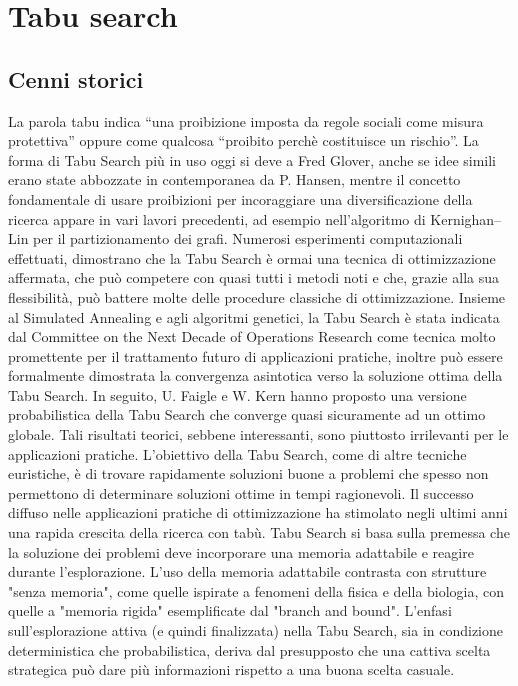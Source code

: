 \chapter{Tabu search}
\section{Cenni storici}
La parola tabu indica “una proibizione imposta da regole sociali come misura protettiva” oppure come qualcosa “proibito perchè costituisce un rischio”.
La forma di Tabu Search più in uso oggi si deve a Fred Glover, anche se idee simili erano state abbozzate in contemporanea da P. Hansen, mentre il concetto fondamentale di usare
proibizioni per incoraggiare una diversificazione della ricerca appare in vari lavori precedenti, ad esempio nell'algoritmo di Kernighan–Lin per il partizionamento dei grafi.
Numerosi esperimenti computazionali effettuati, dimostrano che la Tabu Search è ormai una
tecnica di ottimizzazione affermata, che può competere con quasi tutti i metodi noti e che,
grazie alla sua flessibilità, può battere molte delle procedure classiche di ottimizzazione.
Insieme al Simulated Annealing e agli algoritmi genetici, la Tabu Search è stata indicata dal Committee on the Next Decade of Operations Research come tecnica molto promettente per il trattamento futuro di applicazioni pratiche, inoltre può essere formalmente
dimostrata la convergenza asintotica verso la soluzione ottima della Tabu Search.
In seguito, U. Faigle e W. Kern hanno proposto una versione probabilistica della Tabu
Search che converge quasi sicuramente ad un ottimo globale. Tali risultati teorici, sebbene
interessanti, sono piuttosto irrilevanti per le applicazioni pratiche. L'obiettivo della Tabu Search, come di altre tecniche euristiche, è di trovare rapidamente soluzioni buone a
problemi che spesso non permettono di determinare soluzioni ottime in tempi ragionevoli.
Il successo diffuso nelle applicazioni pratiche di ottimizzazione ha stimolato negli ultimi anni una rapida crescita della ricerca con tabù.
Tabu Search si basa sulla premessa che la soluzione dei problemi deve incorporare una memoria adattabile e reagire durante l'esplorazione. L'uso della memoria adattabile contrasta con strutture "senza memoria", come quelle ispirate a fenomeni della fisica e della biologia, con quelle a "memoria rigida" esemplificate dal "branch and bound". 
L'enfasi sull'esplorazione attiva (e quindi finalizzata) nella Tabu Search, sia in condizione deterministica che probabilistica, deriva dal presupposto che una cattiva scelta strategica può dare più informazioni rispetto a una buona scelta casuale.
\newpage

